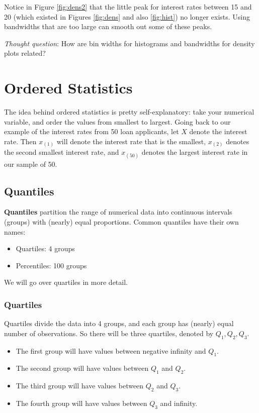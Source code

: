 \documentclass[
]{book}
\providecommand{\tightlist}{%
  \setlength{\itemsep}{0pt}\setlength{\parskip}{0pt}}
\begin{document}
Notice in Figure \ref{fig:dens2} that the little peak for interest rates between 15 and 20 (which existed in Figures \ref{fig:dens} and also \ref{fig:hist}) no longer exists. Using bandwidths that are too large can smooth out some of these peaks.

\emph{Thought question}: How are bin widths for histograms and bandwidths for density plots related?

\hypertarget{ordered-statistics}{%
\section{Ordered Statistics}\label{ordered-statistics}}

The idea behind ordered statistics is pretty self-explanatory: take your numerical variable, and order the values from smallest to largest. Going back to our example of the interest rates from 50 loan applicants, let \(X\) denote the interest rate. Then \(x_{(1)}\) will denote the interest rate that is the smallest, \(x_{(2)}\) denotes the second smallest interest rate, and \(x_{(50)}\) denotes the largest interest rate in our sample of 50.

\hypertarget{quantiles}{%
\subsection{Quantiles}\label{quantiles}}

\textbf{Quantiles} partition the range of numerical data into continuous intervals (groups) with (nearly) equal proportions. Common quantiles have their own names:

\begin{itemize}
\tightlist
\item
  Quartiles: 4 groups
\item
  Percentiles: 100 groups
\end{itemize}

We will go over quartiles in more detail.

\hypertarget{quart}{%
\subsubsection{Quartiles}\label{quart}}

Quartiles divide the data into 4 groups, and each group has (nearly) equal number of observations. So there will be three quartiles, denoted by \(Q_1, Q_2, Q_3\).

\begin{itemize}
\tightlist
\item
  The first group will have values between negative infinity and \(Q_1\).
\item
  The second group will have values between \(Q_1\) and \(Q_2\).
\item
  The third group will have values between \(Q_2\) and \(Q_3\).
\item
  The fourth group will have values between \(Q_3\) and infinity.
\end{itemize}
\end{document}
